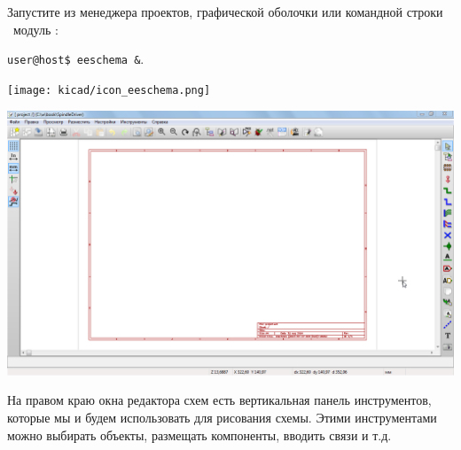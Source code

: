 
Запустите из менеджера проектов, графической оболочки или командной строки
\linux\ модуль \eeschema: 

\bigskip
\noindent\verb|user@host$ eeschema &|.

\bigskip
\noindent\texttt{[image: kicad/icon\_eeschema.png]}

\clearpage\noindent
\includegraphics[width=\textwidth]{kicad/ee15.png}

На правом краю окна редактора схем есть вертикальная панель инструментов,
которые мы и будем использовать для рисования схемы. Этими инструментами можно
выбирать объекты, размещать компоненты, вводить связи и т.д.
